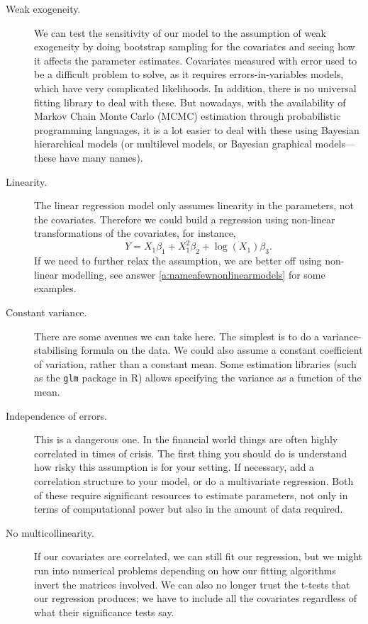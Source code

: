 \documentclass[a4paper]{article}
\begin{document}
\begin{description}
  \item[Weak exogeneity.] We can test the sensitivity of our model to the assumption of weak exogeneity by doing bootstrap sampling for the covariates and seeing how it affects the parameter estimates.
  Covariates measured with error used to be a difficult problem to solve, as it requires errors-in-variables models, which have very complicated likelihoods. In addition, there is no universal fitting library to deal with these. But nowadays, with the availability of Markov Chain Monte Carlo (MCMC) estimation through probabilistic programming languages, it is a lot easier to deal with these using Bayesian hierarchical models (or multilevel models, or Bayesian graphical models---these have many names).
  \item[Linearity.] The linear regression model only assumes linearity in the parameters, not the covariates. Therefore  we could build a regression using non-linear transformations of the covariates, for instance,
  \[
    Y = X_1 \beta_1 +
        X_1^2 \beta_2 +
        \log(X_1) \beta_3
    \text{.}
  \]
  If we need to further relax the assumption, we are better off using non-linear modelling,
  see answer \ref{a:nameafewnonlinearmodels} for some examples.
  \item[Constant variance.] There are some avenues we can take here. The simplest is to do a variance-stabilising formula on the data. We could also assume a constant coefficient of variation, rather than a constant mean. Some estimation libraries (such as the \verb+glm+ package in R) allows specifying the variance as a function of the mean.
  \item[Independence of errors.] This is a dangerous one. In the financial world things are often highly correlated in times of crisis. The first thing you should do is understand how risky this assumption is for your setting. If necessary, add a correlation structure to your model, or do  a multivariate regression. Both of these require significant resources to estimate parameters, not only in terms of computational power but also in the amount of data required.
  \item[No multicollinearity.] If our covariates are correlated, we can still fit our regression, but we might run into numerical problems depending on how our fitting algorithms invert the matrices involved.
  We can also no longer trust the t-tests that our regression produces; we have to include all the covariates regardless of what their significance tests say.

\end{description}
\end{document}
